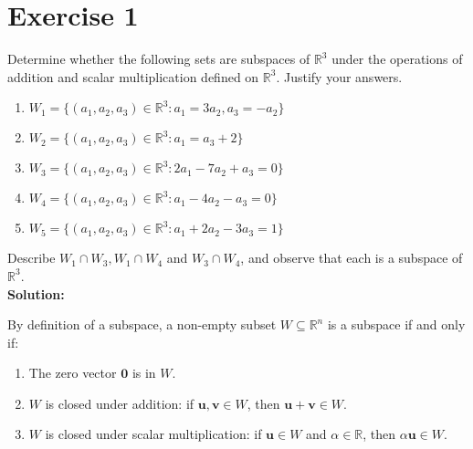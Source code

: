\documentclass{article}
\begin{document}
\section*{Exercise 1}
Determine whether the following sets are subspaces of $\mathbb{R}^3$ under the operations of addition and scalar multiplication defined on $\mathbb{R}^3$. Justify your answers.
\begin{enumerate}[label=(\alph*)]
\item $W_1 = \{(a_1,a_2,a_3) \in \mathbb{R}^3 : a_1 = 3a_2, a_3 = -a_2\}$
\item $W_2 = \{(a_1,a_2,a_3) \in \mathbb{R}^3 : a_1 = a_3 + 2\}$
\item $W_3 = \{(a_1,a_2,a_3) \in \mathbb{R}^3 : 2a_1 - 7a_2 + a_3 = 0\}$
\item $W_4 = \{(a_1,a_2,a_3) \in \mathbb{R}^3 : a_1 - 4a_2 - a_3 = 0\}$
\item $W_5 = \{(a_1,a_2,a_3) \in \mathbb{R}^3 : a_1 + 2a_2 - 3a_3 = 1\}$
\end{enumerate}
Describe $W_1 \cap W_3, W_1 \cap W_4$ and $W_3 \cap W_4$, and observe that each is a subspace of $\mathbb{R}^3$. \\

\textbf{Solution:}

By definition of a subspace, a non-empty subset $W \subseteq \mathbb{R}^n$ is a subspace if and only if:
\begin{enumerate}
    \item The zero vector $\mathbf{0}$ is in $W$.
    \item $W$ is closed under addition: if $\mathbf{u}, \mathbf{v} \in W$, then $\mathbf{u} + \mathbf{v} \in W$.
    \item $W$ is closed under scalar multiplication: if $\mathbf{u} \in W$ and $\alpha \in \mathbb{R}$, then $\alpha \mathbf{u} \in W$.
\end{enumerate}

\bigskip
\end{document}
